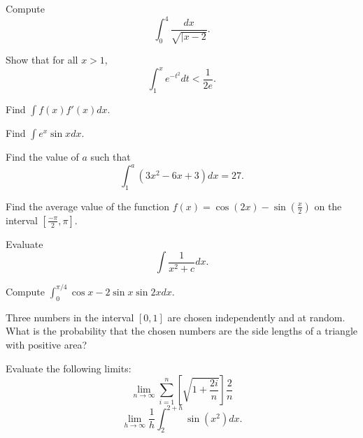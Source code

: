 \documentclass[mast]{lucky}
\begin{document}
\problems



\begin{prob}[SMT 2018/4]{2}
Compute
\[\int_0^4\frac{dx}{\sqrt{|x-2}}.\]
\end{prob}

\begin{prob}{2}
Show that for all $x>1,$
\[\int_{1}^x e^{-t^2}dt<\frac{1}{2e}.\]
\end{prob}

\begin{req}{2}
Find $\int f(x)f'(x)dx.$
\end{req}

\begin{req}{3}
Find $\int e^x\sin xdx.$
\end{req}

\begin{prob}[SMT 2018/3]{3}
Find the value of $a$ such that
\[\int_1^a\left(3x^2-6x+3\right)dx=27.\]
\end{prob}

\begin{prob}{3}
Find the average value of the function $f(x)=\cos(2x)-\sin(\frac{x}{2})$ on the interval $[\frac{-\pi}{2},\pi]$.
\end{prob}

\begin{prob}{4}
Evaluate
\[\int \frac{1}{x^2+c}dx.\]
\end{prob}

\begin{prob}[SMT 2019/3]{4}
Compute $\int_0^{\pi/4}\cos x-2\sin x\sin 2x dx.$
\end{prob}

\begin{req}[AMC 12A 2016/23]{4}
Three numbers in the interval $[0,1]$ are chosen independently and at random. What is the probability that the chosen numbers are the side lengths of a triangle with positive area?
\end{req}

\begin{prob}{6}
Evaluate the following limits:
	\[\lim_{n \to \infty} \sum_{i = 1}^n\left[\sqrt{1+\frac{2i}{n}}\right]\frac{2}{n}\]
	\[\lim_{h \to \infty} \frac{1}{h}\int_{2}^{2+h}\sin(x^2)dx.\]
\end{prob}
\end{document}
